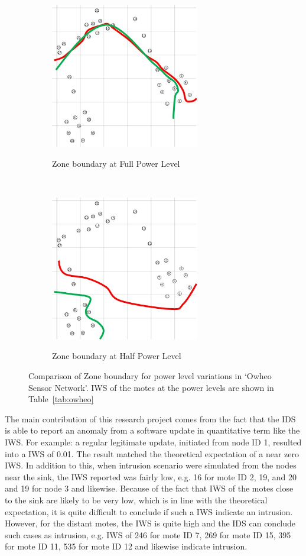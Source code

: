 \documentclass[conference,final]{IEEEtran}
\begin{document}
\begin{figure}[t!]
\label{fig:owheo}
    \centering
    \begin{subfigure}[b]{0.5\textwidth}
        \centering
        \includegraphics[height=2.5in]{Owheo_full}
        \label{subfig:owheo_full}
        \caption{Zone boundary at Full Power Level}
    \end{subfigure}%
    ~ 
    \begin{subfigure}[b]{0.5\textwidth}
        \centering
        \includegraphics[height=2.5in]{Owheo_half}
        \label{subfig:owheo_half}
        \caption{Zone boundary at Half Power Level}
    \end{subfigure}
    \caption{Comparison of Zone boundary for power level variations in `Owheo Sensor Network'. IWS of the motes at the power levels are shown in Table~\ref{tab:owheo}}
\end{figure}

The main contribution of this research project comes from the fact that the IDS is able to report an anomaly from a software update in quantitative term like the IWS.
For example:  a regular legitimate update, initiated from node ID 1, resulted into a IWS of 0.01.
The result matched the theoretical expectation of a near zero IWS.
In addition to this, when intrusion scenario were simulated from the nodes near the sink, the IWS reported was fairly low, e.g. 16 for mote ID 2, 19, and 20
 and 19 for node 3 
 and likewise.
Because of the fact that IWS of the motes close to the sink are likely to be very low, which is in line with the theoretical expectation, it is quite difficult to conclude if such a IWS indicate an intrusion. 
However, for the distant motes, the IWS is quite high and the IDS can conclude such cases as intrusion, e.g. IWS of 246 for mote ID 7, 269 for mote ID 15, 395 for mote ID 11, 535 for mote ID 12 and likewise indicate intrusion.
\end{document}
